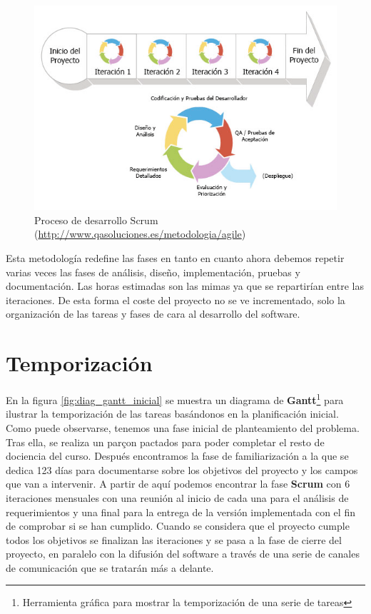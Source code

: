 \begin{figure}[!ht]
  \begin{center}
  \includegraphics[width=1\textwidth]{../images/scrum-iteration-detail-es.png}
  \caption[Proceso de desarrollo Scrum]{Proceso de desarrollo Scrum (\url{http://www.qasoluciones.es/metodologia/agile})}
  \label{fig:diag_scrum}
  \end{center}
\end{figure}

Esta metodología redefine las fases en tanto en cuanto ahora debemos repetir varias veces las fases de análisis, diseño, implementación, pruebas y documentación. Las horas estimadas son las mimas ya que se repartirían entre las iteraciones. De esta forma el coste del proyecto no se ve incrementado, solo la organización de las tareas y fases de cara al desarrollo del software. 

\section{Temporización}

En la figura \ref{fig:diag_gantt_inicial} se muestra un diagrama de \textbf{Gantt}\footnote{Herramienta gráfica para mostrar la temporización de una serie de tareas} para ilustrar la temporización de las tareas basándonos en la planificación inicial. Como puede observarse, tenemos una fase inicial de planteamiento del problema. Tras ella, se realiza un parçon pactados para poder completar el resto de dociencia del curso. Después encontramos la fase de familiarización a la que se dedica 123 días para documentarse sobre los objetivos del proyecto y los campos que van a intervenir. A partir de aquí podemos encontrar la fase \textbf{Scrum} con 6 iteraciones mensuales con una reunión al inicio de cada una para el análisis de requerimientos y una final para la entrega de la versión implementada con el fin de comprobar si se han cumplido. Cuando se considera que el proyecto cumple todos los objetivos se finalizan las iteraciones y se pasa a la fase de cierre del proyecto, en paralelo con la difusión del software a través de una serie de canales de comunicación que se tratarán más a delante.

